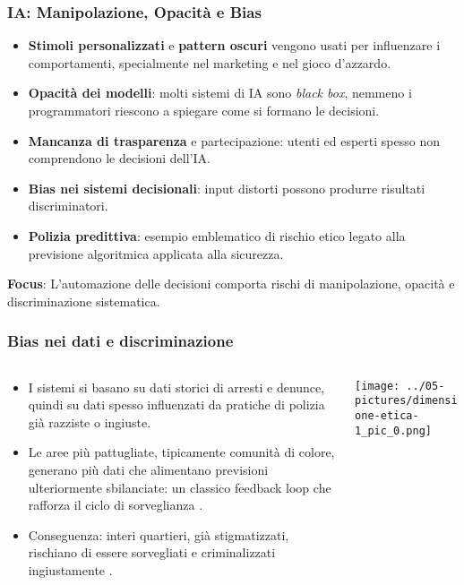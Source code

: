 \documentclass{beamer}
\begin{document}
%
%
\begin{frame}
\frametitle{IA: Manipolazione, Opacità e Bias}

\begin{itemize}
    \item \textbf{Stimoli personalizzati} e \textbf{pattern oscuri} vengono usati per influenzare i comportamenti, specialmente nel marketing e nel gioco d'azzardo.
    \item \textbf{Opacità dei modelli}: molti sistemi di IA sono \textit{black box}, nemmeno i programmatori riescono a spiegare come si formano le decisioni.
    \item \textbf{Mancanza di trasparenza} e partecipazione: utenti ed esperti spesso non comprendono le decisioni dell’IA.
    \item \textbf{Bias nei sistemi decisionali}: input distorti possono produrre risultati discriminatori.
    \item \textbf{Polizia predittiva}: esempio emblematico di rischio etico legato alla previsione algoritmica applicata alla sicurezza.
\end{itemize}

\vspace{0.3cm}
{\small
\textbf{Focus}: L'automazione delle decisioni comporta rischi di manipolazione, opacità e discriminazione sistematica.
}

\end{frame}
%
%
\begin{frame}
\frametitle{Bias nei dati e discriminazione}
\begin{columns}[T] %
\begin{column}{.48\textwidth}
        \begin{itemize}
        \small
		\item I sistemi si basano su dati storici di arresti e denunce, quindi su dati spesso influenzati da pratiche di polizia già razziste o ingiuste. 
		\item Le aree più pattugliate, tipicamente comunità di colore, generano più dati che alimentano previsioni ulteriormente sbilanciate: un classico feedback loop che rafforza il ciclo di sorveglianza .
\item Conseguenza: interi quartieri, già stigmatizzati, rischiano di essere sorvegliati e criminalizzati ingiustamente .
        \end{itemize}
\end{column}%
\hfill%
\begin{column}{.48\textwidth}
        \texttt{[image: ../05-pictures/dimensione-etica-1\_pic\_0.png]}
\end{column}%
\end{columns}
\end{frame}
\end{document}
